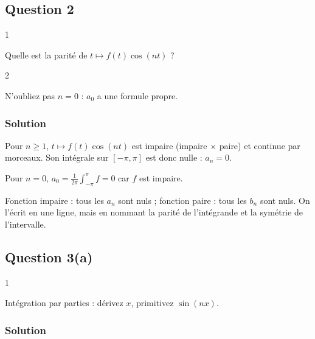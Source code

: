 \documentclass[11pt,a4paper]{article}
\newcommand{\equationajustee}[1]{%
  \sbox{\boiteequation}{$\displaystyle #1$}%
  \ifdim\wd\boiteequation>\linewidth
    \[\resizebox{\linewidth}{!}{\usebox{\boiteequation}}\]%
  \else
    \[#1\]%
  \fi}
\begin{document}
\hypertarget{question-2}{%
\subsection{Question 2}\label{question-2}}

\begin{indication}{1}

Quelle est la parité de \(t\mapsto f(t)\cos(nt)\) ?

\end{indication}

\begin{indication}{2}

N'oubliez pas \(n=0\) : \(a_0\) a une formule propre.

\end{indication}

\hypertarget{solution-1}{%
\subsubsection{Solution}\label{solution-1}}

Pour \(n\ge1\), \(t\mapsto f(t)\cos(nt)\) est impaire (impaire × paire) et continue par morceaux. Son intégrale sur \([-\pi,\pi]\) est donc nulle : \(a_n=0\).

Pour \(n=0\), \(a_0=\frac1{2\pi}\int_{-\pi}^{\pi}f=0\) car \(f\) est impaire.

\equationajustee{\boxed{\forall n\in\mathbb{N},\ a_n=0.}}

\begin{methode}

Fonction impaire : tous les \(a_n\) sont nuls ; fonction paire : tous les \(b_n\) sont nuls. On l'écrit en une ligne, mais en nommant la parité de l'intégrande et la symétrie de l'intervalle.

\end{methode}

\hypertarget{question-3a}{%
\subsection{Question 3(a)}\label{question-3a}}

\begin{indication}{1}

Intégration par parties : dérivez \(x\), primitivez \(\sin(nx)\).

\end{indication}

\hypertarget{solution-2}{%
\subsubsection{Solution}\label{solution-2}}
\end{document}
